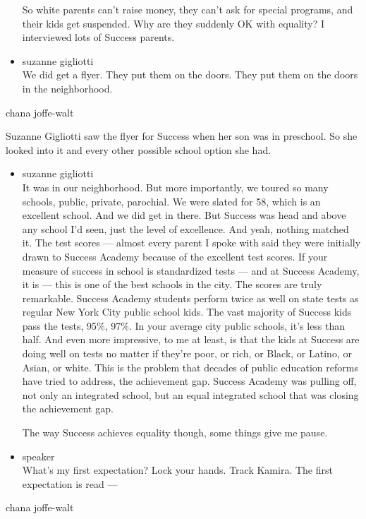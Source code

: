 \begin{itemize}
  So white parents can't raise money, they can't ask for special
  programs, and their kids get suspended. Why are they suddenly OK with
  equality? I interviewed lots of Success parents.
\item
  suzanne gigliotti\\
  We did get a flyer. They put them on the doors. They put them on the
  doors in the neighborhood.
\end{itemize}

chana joffe-walt

Suzanne Gigliotti saw the flyer for Success when her son was in
preschool. So she looked into it and every other possible school option
she had.

\begin{itemize}
\item
  suzanne gigliotti\\
  It was in our neighborhood. But more importantly, we toured so many
  schools, public, private, parochial. We were slated for 58, which is
  an excellent school. And we did get in there. But Success was head and
  above any school I'd seen, just the level of excellence. And yeah,
  nothing matched it. The test scores --- almost every parent I spoke
  with said they were initially drawn to Success Academy because of the
  excellent test scores. If your measure of success in school is
  standardized tests --- and at Success Academy, it is --- this is one
  of the best schools in the city. The scores are truly remarkable.
  Success Academy students perform twice as well on state tests as
  regular New York City public school kids. The vast majority of Success
  kids pass the tests, 95\%, 97\%. In your average city public schools,
  it's less than half. And even more impressive, to me at least, is that
  the kids at Success are doing well on tests no matter if they're poor,
  or rich, or Black, or Latino, or Asian, or white. This is the problem
  that decades of public education reforms have tried to address, the
  achievement gap. Success Academy was pulling off, not only an
  integrated school, but an equal integrated school that was closing the
  achievement gap.

  The way Success achieves equality though, some things give me pause.
\item
  speaker\\
  What's my first expectation? Lock your hands. Track Kamira. The first
  expectation is read ---
\end{itemize}

chana joffe-walt

